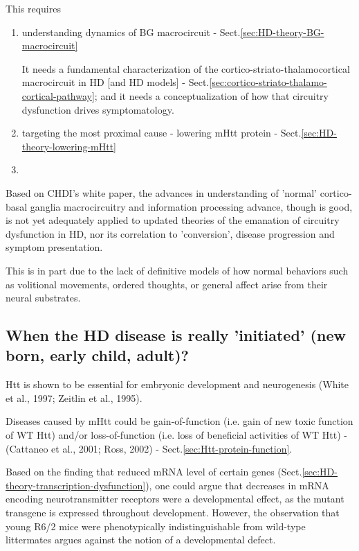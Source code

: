 This requires
\begin{enumerate}
  \item understanding dynamics of BG macrocircuit -
  Sect.\ref{sec:HD-theory-BG-macrocircuit}

It needs a fundamental characterization of the cortico-striato-thalamocortical
macrocircuit in HD [and HD models] -
Sect.\ref{sec:cortico-striato-thalamo-cortical-pathway}; and it needs a
conceptualization of how that circuitry dysfunction drives symptomatology.
    
  \item targeting the most proximal cause - lowering mHtt protein -
  Sect.\ref{sec:HD-theory-lowering-mHtt}
  
  \item 
\end{enumerate}

Based on CHDI's white paper, the advances in understanding of 'normal'
cortico-basal ganglia macrocircuitry and information processing advance, though
is good, is not yet adequately applied to updated theories of the emanation of
circuitry dysfunction in HD, nor its correlation to 'conversion', disease
progression and symptom presentation.


This is in part due to the lack of definitive models of how normal behaviors
such as volitional movements, ordered thoughts, or general affect arise from
their neural substrates.

\subsection{When the HD disease is really 'initiated' (new born, early child,
adult)?}

Htt is shown to be essential for embryonic development and neurogenesis (White
et al., 1997; Zeitlin et al., 1995).

Diseases caused by mHtt could be gain-of-function (i.e. gain of new toxic
function of WT Htt) and/or loss-of-function (i.e. loss of beneficial activities
of WT Htt) - (Cattaneo et al., 2001; Ross, 2002) -
Sect.\ref{sec:Htt-protein-function}.

Based on the finding that reduced mRNA level of certain genes
(Sect.\ref{sec:HD-theory-transcription-dysfunction}), one could argue that
decreases in mRNA encoding neurotransmitter receptors were a developmental
effect, as the mutant transgene is expressed throughout development.
However, the observation that young R6/2 mice were phenotypically
indistinguishable from wild-type littermates argues against the notion of a
developmental defect.


